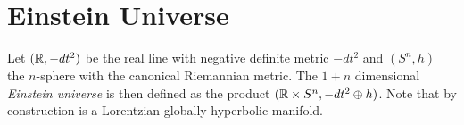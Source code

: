 

\section{Einstein Universe}

\begin{definition}
Let $(\mathbb{R},-dt^2)$ be the real line with negative definite metric $-dt^2$ and $(S^n,h)$ the $n$-sphere with the canonical Riemannian metric. The $1+n$ dimensional \emph{Einstein universe} is then defined as the product $(\mathbb{R}\times S^n, -dt^2 \oplus h)$. Note that by construction is a Lorentzian globally hyperbolic manifold.
\end{definition}


